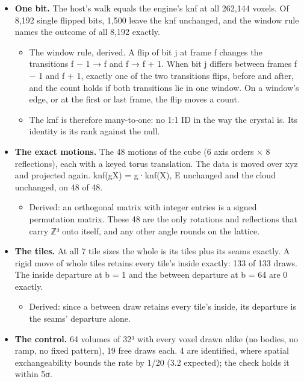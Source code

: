 \begin{itemize}
\item \textbf{One bit.} The host's walk equals the engine's knf at all 262,144 voxels. Of 8,192 single flipped bits, 1,500 leave the knf unchanged, and the window rule names the outcome of all 8,192 exactly.

\begin{itemize}
\item The window rule, derived. A flip of bit j at frame f changes the transitions f − 1 → f and f → f + 1. When bit j differs between frames f − 1 and f + 1, exactly one of the two transitions flips, before and after, and the count holds if both transitions lie in one window. On a window's edge, or at the first or last frame, the flip moves a count.
\item The knf is therefore many-to-one: no 1:1 ID in the way the crystal is. Its identity is its rank against the null.
\end{itemize}
\item \textbf{The exact motions.} The 48 motions of the cube (6 axis orders × 8 reflections), each with a keyed torus translation. The data is moved over xyz and projected again. knf(gX) = g·knf(X), E unchanged and the cloud unchanged, on 48 of 48.

\begin{itemize}
\item Derived: an orthogonal matrix with integer entries is a signed permutation matrix. These 48 are the only rotations and reflections that carry ℤ³ onto itself, and any other angle rounds on the lattice.
\end{itemize}
\item \textbf{The tiles.} At all 7 tile sizes the whole is its tiles plus its seams exactly. A rigid move of whole tiles retains every tile's inside exactly: 133 of 133 draws. The inside departure at b = 1 and the between departure at b = 64 are 0 exactly.

\begin{itemize}
\item Derived: since a between draw retains every tile's inside, its departure is the seams' departure alone.
\end{itemize}
\item \textbf{The control.} 64 volumes of 32³ with every voxel drawn alike (no bodies, no ramp, no fixed pattern), 19 free draws each. 4 are identified, where spatial exchangeability bounds the rate by 1/20 (3.2 expected); the check holds it within 5σ.
\end{itemize}

